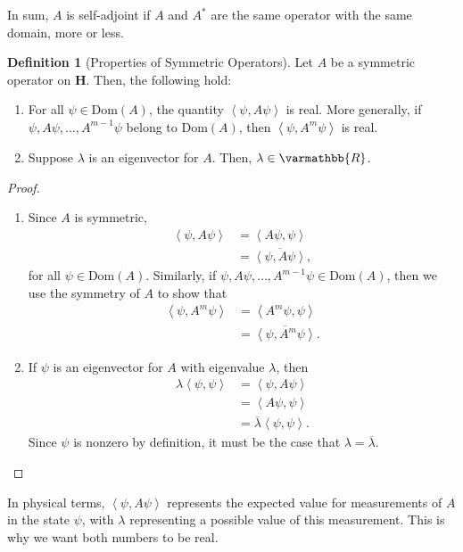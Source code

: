 \documentclass[12pt]{extarticle}
\newcommand{\R}{\varmathbb{R}}
\newcommand{\iprod}[2]{\left\langle #1,#2\right\rangle}
\theoremstyle{plain}
\theoremstyle{definition}
\newtheorem*{definition}{Definition}
\theoremstyle{remark}
\renewcommand{\newline}{\hfill\break}
\begin{document}
  In sum, $A$ is self-adjoint if $A$ and $A^{\ast}$ are the same operator with the same domain, more or less.
  \begin{definition}[Properties of Symmetric Operators]
    Let $A$ be a symmetric operator on $\mathbf{H}$. Then, the following hold:
    \begin{enumerate}[(1)]
      \item For all $\psi\in \text{Dom}(A)$, the quantity $\iprod{\psi}{A\psi}$ is real. More generally, if $\psi, A\psi, \dots, A^{m-1}\psi$ belong to $\text{Dom}(A)$, then $\iprod{\psi}{A^{m}\psi}$ is real.
      \item Suppose $\lambda$ is an eigenvector for $A$. Then, $\lambda \in \R$.
    \end{enumerate}
  \end{definition}
  \begin{proof}
    \begin{enumerate}[(1)]
      \item Since $A$ is symmetric,
        \begin{align*}
          \iprod{\psi}{A\psi} &= \iprod{A\psi}{\psi}\\
                              &= \overline{\iprod{\psi}{A\psi}},
        \end{align*}
        for all $\psi \in \text{Dom}(A)$. Similarly, if $\psi,A\psi,\dots,A^{m-1}\psi\in \text{Dom}(A)$, then we use the symmetry of $A$ to show that
        \begin{align*}
          \iprod{\psi}{A^{m}\psi} &= \iprod{A^{m}\psi}{\psi}\\
                                  &= \overline{\iprod{\psi}{A^{m}\psi}}.
        \end{align*}
      \item If $\psi$ is an eigenvector for $A$ with eigenvalue $\lambda$, then
        \begin{align*}
          \lambda \iprod{\psi}{\psi} &= \iprod{\psi}{A\psi}\\
                                     &= \iprod{A\psi}{\psi}\\
                                     &= \overline{\lambda}\iprod{\psi}{\psi}.
        \end{align*}
        Since $\psi$ is nonzero by definition, it must be the case that $\lambda = \overline{\lambda}$.
    \end{enumerate}
  \end{proof}
  In physical terms, $\iprod{\psi}{A\psi}$ represents the expected value for measurements of $A$ in the state $\psi$, with $\lambda$ representing a possible value of this measurement. This is why we want both numbers to be real.\newline
\end{document}
